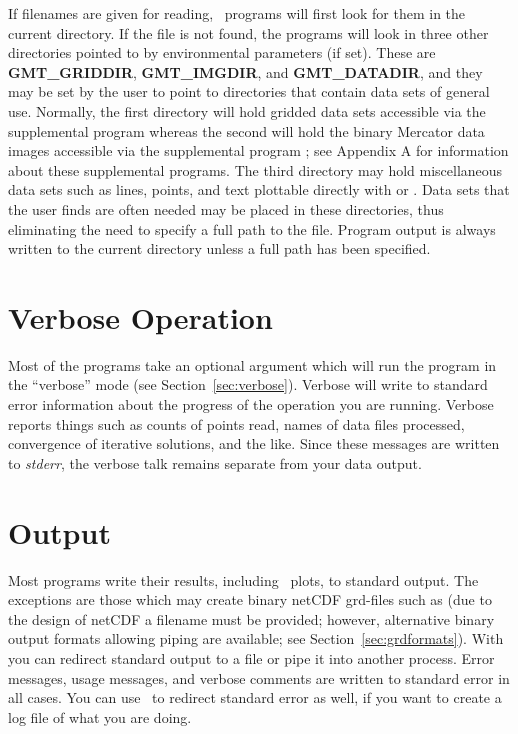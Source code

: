 If filenames are given for reading, \GMT\ programs will first look for them in the
current directory.  If the file is not found, the programs
will look in three other directories pointed to by environmental
parameters (if set).  These are {\bf GMT\_GRIDDIR}, {\bf GMT\_IMGDIR}, and
{\bf GMT\_DATADIR}, and they may be set by the user to point to directories
that contain data sets of general use.  Normally, the first directory will
hold gridded data sets accessible via the supplemental program 
whereas the second will hold the binary Mercator data images accessible via
the supplemental program ; see Appendix A for information
about these supplemental programs.  The third directory may hold miscellaneous
data sets such as lines, points, and text plottable directly with 
or .  Data sets that the user finds are often needed
may be placed in these directories, thus eliminating the need to specify
a full path to the file.  Program output is always written to the
current directory unless a full path has been specified.

\section{Verbose Operation}

Most of the programs take an optional  argument
which will run the program in the ``verbose'' mode (see Section~\ref{sec:verbose}).
Verbose will write to standard error information about the progress
of the operation you are running.  Verbose reports things
such as counts of points read, names of data files
processed, convergence of iterative solutions, and the like.
Since these messages are written to {\it stderr},  the
verbose talk remains separate from your data output. 

\section{Output}

Most programs write their results, including \PS\
plots, to standard output.  The exceptions are those which may
create binary netCDF grd-files such as  (due to
the design of netCDF a filename must be provided; however,
alternative binary output formats allowing piping are available; see Section~\ref{sec:grdformats}).
With \UNIX\, you can redirect standard output to a file or pipe it
into another process.  Error messages, usage messages, and
verbose comments are written to standard error in all cases.
You can use \UNIX\ to redirect standard error as well,
if you want to create a log file of what you are doing. 

